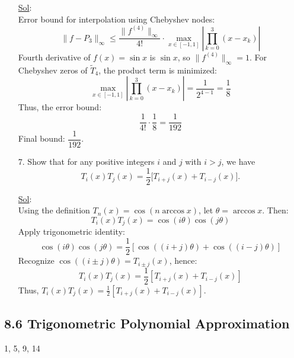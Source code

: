 \begin{enumerate}
    \underline{Sol}:\\
    Error bound for interpolation using Chebyshev nodes:
    \[
      \|f - P_3\|_{\infty} \leq \frac{\|f^{(4)}\|_{\infty}}{4!} \cdot
      \max_{x \in [-1,1]} \left| \prod_{k=0}^3 (x - x_k) \right|
    \]
    Fourth derivative of \(f(x) = \sin x\) is \(\sin x\), so
    \(\|f^{(4)}\|_{\infty} = 1\). For Chebyshev zeros of
    \(\tilde{T}_4\), the product term is minimized:
    \[
      \max_{x \in [-1,1]} \left| \prod_{k=0}^3 (x - x_k) \right| =
      \frac{1}{2^{4-1}} = \frac{1}{8}
    \]
    Thus, the error bound:
    \[
      \frac{1}{4!} \cdot \frac{1}{8} = \frac{1}{192}
    \]
    Final bound: \(\boxed{\dfrac{1}{192}}\).

  \item[7.] Show that for any positive integers \(i\) and \(j\) with
    \(i > j\), we have
    \[
      T_i (x) T_j (x) = \frac{1}{2} \lbrack T_{i + j} (x) + T_{i - j}
      (x) \rbrack.
    \]

    \underline{Sol}:\\
    Using the definition \( T_n(x) = \cos(n \arccos x) \), let \(
    \theta = \arccos x \). Then:
    \[
      T_i(x)T_j(x) = \cos(i\theta)\cos(j\theta)
    \]
    Apply trigonometric identity:
    \[
      \cos(i\theta)\cos(j\theta) = \frac{1}{2}\left[\cos((i+j)\theta)
      + \cos((i-j)\theta)\right]
    \]
    Recognize \( \cos((i \pm j)\theta) = T_{i \pm j}(x) \), hence:
    \[
      T_i(x)T_j(x) = \frac{1}{2}\left[T_{i+j}(x) + T_{i-j}(x)\right]
    \]
    Thus, \(\boxed{T_i (x) T_j (x) = \frac{1}{2} \left[ T_{i + j} (x)
    + T_{i - j} (x) \right]}\).
\end{enumerate}

\subsection*{8.6 Trigonometric Polynomial Approximation}

1, 5, 9, 14

